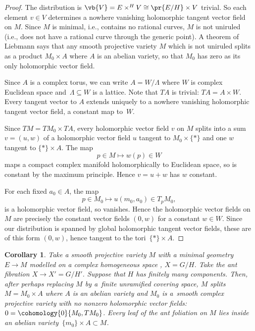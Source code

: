 \documentclass[pdftex]{sigma}
\numberwithin{equation}{section}
\newtheorem{Corollary}[Theorem]{Corollary}
\begin{document}
\begin{proof}
The distribution is $\vb{V} = E \times^H V \cong \pr{E/H} \times V$ trivial.
So each element $v \in V$ determines a nowhere vanishing holomorphic tangent vector field on $M$.
Since $M$ is minimal, i.e., contains no rational curves, $M$ is not uniruled (i.e., does not have a rational curve through the generic point).
A theorem of Liebmann \cite[Theorem 1.1]{Pereira/Touzet:2012} says that any smooth projective variety $M$ which is not uniruled splits as a product $M_0\times A$ where $A$ is an abelian variety, so that $M_0$ has zero as its only holomorphic vector field.

Since $A$ is a complex torus, we can write $A=W/\Lambda$ where $W$ is complex Euclidean space and~$\Lambda\subseteq W$ is a lattice.
Note that $TA$ is trivial: $TA=A\times W$.
Every tangent vector to $A$ extends uniquely to a nowhere vanishing holomorphic tangent vector field, a constant map to~$W$.

Since $TM=TM_0\times TA$, every holomorphic vector field $v$ on $M$ splits into a sum $v=(u,w)$ of a holomorphic vector field $u$ tangent to $M_0\times\{*\}$ and one $w$ tangent to $\{*\}\times A$.
The map
\[
p\in M\mapsto w(p)\in W
\]
maps a compact complex manifold holomorphically to Euclidean space, so is constant by the maximum principle.
Hence $v=u+w$ has $w$ constant.

For each fixed $a_0\in A$, the map
\[
p\in M_0\mapsto u(m_0,a_0)\in T_p M_0,
\]
is a holomorphic vector field, so vanishes.
Hence the holomorphic vector fields on $M$ are precisely the constant vector fields $(0,w)$ for a constant $w\in W$.
Since our distribution is spanned by global holomorphic tangent vector fields, these are of this form $(0,w)$, hence tangent to the tori~$\{*\}\times A$.
\end{proof}

\begin{Corollary}\label{cor:splitting}
Take a smooth projective variety $M$ with a minimal geometry $E \to M$ modelled on a complex
homogeneous space , $X = G/H$.
Take the ant fibration $X \to X' = G/H'$.
Suppose that $H$ has finitely many components.
Then, after perhaps replacing $M$ by a~finite unramified covering space, $M$ splits
$M = M_0 \times A$ where $A$ is an abelian variety and $M_0$ is a~smooth complex projective
variety with no nonzero holomorphic vector fields: $0 = \cohomology{0}{M_0,TM_0}$.
Every leaf of the ant foliation on $M$ lies inside an abelian variety~${\{m_0\} \times A \subset M}$.
\end{Corollary}
\end{document}
